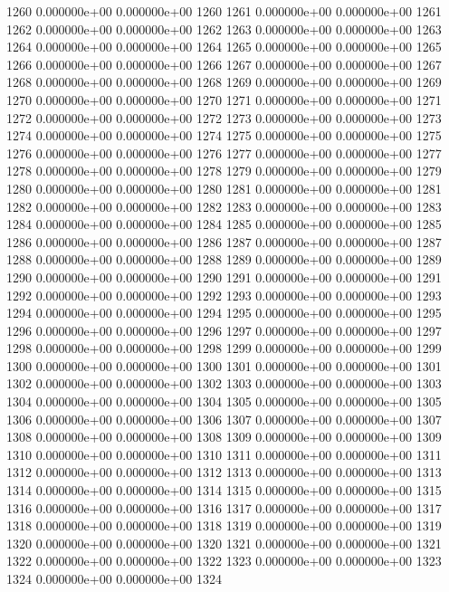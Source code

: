 \documentclass{article}
\begin{document}
\begin{Schunk}
\begin{Soutput}
1260   0.000000e+00   0.000000e+00 1260
1261   0.000000e+00   0.000000e+00 1261
1262   0.000000e+00   0.000000e+00 1262
1263   0.000000e+00   0.000000e+00 1263
1264   0.000000e+00   0.000000e+00 1264
1265   0.000000e+00   0.000000e+00 1265
1266   0.000000e+00   0.000000e+00 1266
1267   0.000000e+00   0.000000e+00 1267
1268   0.000000e+00   0.000000e+00 1268
1269   0.000000e+00   0.000000e+00 1269
1270   0.000000e+00   0.000000e+00 1270
1271   0.000000e+00   0.000000e+00 1271
1272   0.000000e+00   0.000000e+00 1272
1273   0.000000e+00   0.000000e+00 1273
1274   0.000000e+00   0.000000e+00 1274
1275   0.000000e+00   0.000000e+00 1275
1276   0.000000e+00   0.000000e+00 1276
1277   0.000000e+00   0.000000e+00 1277
1278   0.000000e+00   0.000000e+00 1278
1279   0.000000e+00   0.000000e+00 1279
1280   0.000000e+00   0.000000e+00 1280
1281   0.000000e+00   0.000000e+00 1281
1282   0.000000e+00   0.000000e+00 1282
1283   0.000000e+00   0.000000e+00 1283
1284   0.000000e+00   0.000000e+00 1284
1285   0.000000e+00   0.000000e+00 1285
1286   0.000000e+00   0.000000e+00 1286
1287   0.000000e+00   0.000000e+00 1287
1288   0.000000e+00   0.000000e+00 1288
1289   0.000000e+00   0.000000e+00 1289
1290   0.000000e+00   0.000000e+00 1290
1291   0.000000e+00   0.000000e+00 1291
1292   0.000000e+00   0.000000e+00 1292
1293   0.000000e+00   0.000000e+00 1293
1294   0.000000e+00   0.000000e+00 1294
1295   0.000000e+00   0.000000e+00 1295
1296   0.000000e+00   0.000000e+00 1296
1297   0.000000e+00   0.000000e+00 1297
1298   0.000000e+00   0.000000e+00 1298
1299   0.000000e+00   0.000000e+00 1299
1300   0.000000e+00   0.000000e+00 1300
1301   0.000000e+00   0.000000e+00 1301
1302   0.000000e+00   0.000000e+00 1302
1303   0.000000e+00   0.000000e+00 1303
1304   0.000000e+00   0.000000e+00 1304
1305   0.000000e+00   0.000000e+00 1305
1306   0.000000e+00   0.000000e+00 1306
1307   0.000000e+00   0.000000e+00 1307
1308   0.000000e+00   0.000000e+00 1308
1309   0.000000e+00   0.000000e+00 1309
1310   0.000000e+00   0.000000e+00 1310
1311   0.000000e+00   0.000000e+00 1311
1312   0.000000e+00   0.000000e+00 1312
1313   0.000000e+00   0.000000e+00 1313
1314   0.000000e+00   0.000000e+00 1314
1315   0.000000e+00   0.000000e+00 1315
1316   0.000000e+00   0.000000e+00 1316
1317   0.000000e+00   0.000000e+00 1317
1318   0.000000e+00   0.000000e+00 1318
1319   0.000000e+00   0.000000e+00 1319
1320   0.000000e+00   0.000000e+00 1320
1321   0.000000e+00   0.000000e+00 1321
1322   0.000000e+00   0.000000e+00 1322
1323   0.000000e+00   0.000000e+00 1323
1324   0.000000e+00   0.000000e+00 1324

\end{Soutput}
\end{Schunk}
\end{document}
